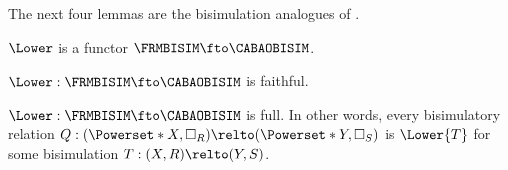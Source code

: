 \documentclass[a4paper,UKenglish,cleveref, autoref]{lipics-v2021}
\begin{document}
The next four lemmas are the bisimulation analogues of
.

\begin{lemma}
  \(\Lower\) is a functor \(\FRMBISIM \fto \CABAOBISIM\).
\end{lemma}

\begin{lemma}
  \(\Lower : \FRMBISIM \fto \CABAOBISIM\) is faithful.
\end{lemma}

\begin{lemma}\label{lem:lower-CABAOBISIM-full}
  \(\Lower : \FRMBISIM \fto \CABAOBISIM\) is full. In other words, every
  bisimulatory relation \(Q : (\Powerset*{X}, \Box_R) \relto (\Powerset*{Y},
  \Box_S)\) is \(\Lower{T}\) for some bisimulation \(T : (X, R) \relto (Y,
  S)\).
\end{lemma}
\end{document}
